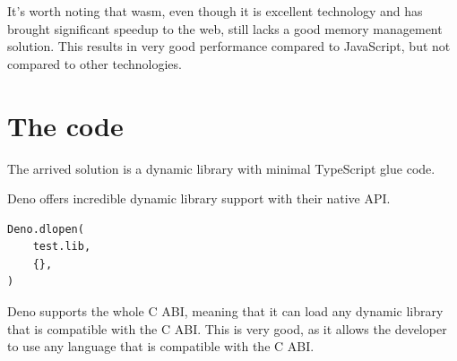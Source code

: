 \documentclass[10pt,journal,compsoc]{IEEEtran}
\begin{document}
It's worth noting that wasm, even though it is excellent technology and has brought significant speedup to the web, still lacks a good memory management solution. This results in very good performance compared to JavaScript, but not compared to other technologies.

\section{The code}

The arrived solution is a dynamic library with minimal TypeScript glue code.

Deno offers incredible dynamic library support with their native API.

\begin{lstlisting}
Deno.dlopen(
    test.lib,
    {},
)
\end{lstlisting}

Deno supports the whole C ABI, meaning that it can load any dynamic library that is compatible with the C ABI. This is very good, as it allows the developer to use any language that is compatible with the C ABI.
\end{document}
